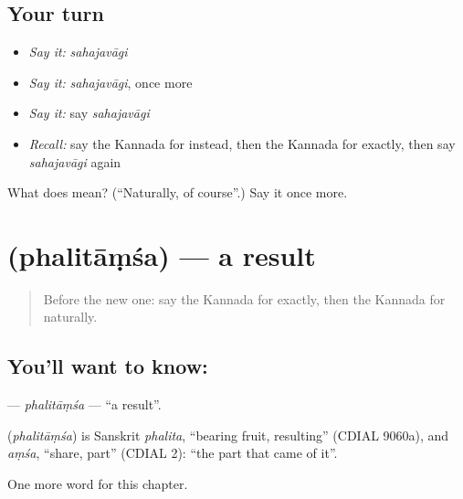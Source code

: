 \subsection*{Your turn}
\begin{itemize}
\raggedright
  \item \emph{Say it:} \emph{sahajavāgi}
  \item \emph{Say it:} \emph{sahajavāgi}, once more
  \item \emph{Say it:} say \emph{sahajavāgi}
  \item \emph{Recall:} say the Kannada for instead, then the Kannada for exactly, then say \emph{sahajavāgi} again
\end{itemize}

\begin{tcolorbox}[breakable,colback=teal!4,colframe=teal!35!black,title={Before you move on}]
What does  mean? (\textquotedblleft{}Naturally, of course\textquotedblright{}.) Say it once more.
\end{tcolorbox}
\section[\texorpdfstring{\kn{ಫಲಿತಾಂಶ} (phalitāṃśa)}{ಫಲಿತಾಂಶ (phalitāṃśa)}]{ (phalitāṃśa) — a result}

\label{lesson:KA-C177-phalitamsa}



\begin{quote}
Before the new one: say the Kannada for exactly, then the Kannada for naturally.
\end{quote}

\subsection*{You'll want to know: }
\textbf{} — \emph{phalitāṃśa} — \textquotedblleft{}a result\textquotedblright{}.

\begin{cousinweb}
\textbf{} (\emph{phalitāṃśa}) is Sanskrit \emph{phalita}, \textquotedblleft{}bearing fruit, resulting\textquotedblright{} (CDIAL 9060a), and \emph{aṃśa}, \textquotedblleft{}share, part\textquotedblright{} (CDIAL 2): \textquotedblleft{}the part that came of it\textquotedblright{}.
\end{cousinweb}

\begin{grammarlens}[title={What you've built}]
One more word for this chapter.
\end{grammarlens}

